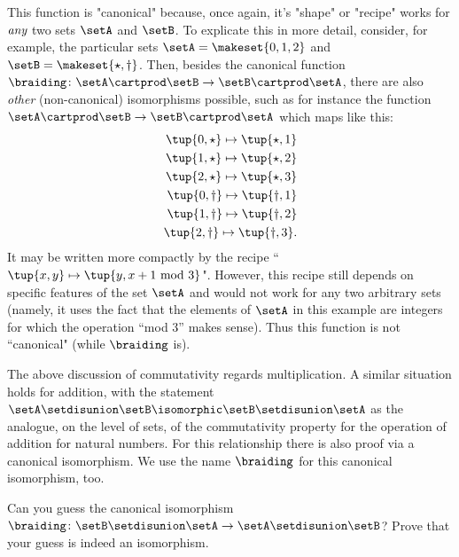 This function is "canonical" because, once again, it's "shape" or "recipe" works for $\emph{any}$ two sets $\setA$ and $\setB$. To explicate this in more detail, consider, for example, the particular sets $\setA = \makeset{0, 1, 2}$ and $\setB = \makeset{\star, \dagger}$. Then, besides the canonical function $\braiding \colon \setA \cartprod \setB \to \setB \cartprod \setA$, there are also \emph{other} (non-canonical) isomorphisms possible, such as for instance the function $\setA \cartprod \setB \to \setB \cartprod \setA$ which maps like this: 
\begin{align}
\tup{0, \star} \mapsto \tup{\star, 1} \\
\tup{1, \star} \mapsto \tup{\star, 2} \\
\tup{2, \star} \mapsto \tup{\star, 3} \\
\tup{0, \dagger} \mapsto \tup{\dagger, 1} \\
\tup{1, \dagger} \mapsto \tup{\dagger, 2} \\
\tup{2, \dagger} \mapsto \tup{\dagger, 3}.
\end{align}
It may be written more compactly by the recipe ``$\tup{x, y} \mapsto \tup{y, x +1 \text{ mod } 3}$". However, this recipe still depends on specific features of the  set $\setA$ and would not work for any two arbitrary sets (namely, it uses the fact that the elements of $\setA$ in this example are integers for which the operation ``mod 3'' makes sense). Thus this function is not ``canonical" (while $\braiding$ is). 


The above discussion of commutativity regards multiplication. A similar situation holds for addition, with the statement $\setA \setdisunion \setB \isomorphic \setB \setdisunion \setA$ as the analogue, on the level of sets, of the commutativity property for the operation of addition for natural numbers. For this relationship there is also proof via a canonical isomorphism. We use the name $\braiding$ for this canonical isomorphism, too. 

\begin{exercise}\label{ex:braiding-disjoint-union}
Can you guess the canonical isomorphism $\braiding \colon \setB \setdisunion \setA \to \setA \setdisunion \setB$? Prove that your guess is indeed an isomorphism. 
\end{exercise}

\begin{solution}
\end{solution}

